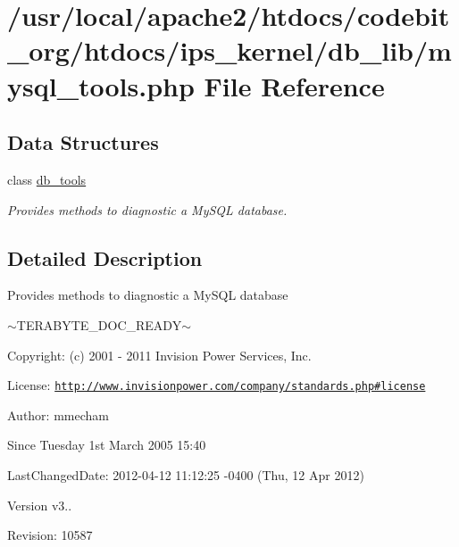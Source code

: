 \hypertarget{mysql__tools_8php}{\section{/usr/local/apache2/htdocs/codebit\-\_\-org/htdocs/ips\-\_\-kernel/db\-\_\-lib/mysql\-\_\-tools.php File Reference}
\label{mysql__tools_8php}
}
\subsection*{Data Structures}
\begin{DoxyCompactItemize}
\item 
class \hyperlink{classdb__tools}{db\-\_\-tools}
\begin{DoxyCompactList}\small\item\em Provides methods to diagnostic a My\-S\-Q\-L database. \end{DoxyCompactList}\end{DoxyCompactItemize}


\subsection{Detailed Description}
\begin{DoxyVerb}  Provides methods to diagnostic a MySQL database
\end{DoxyVerb}
 $\sim$\-T\-E\-R\-A\-B\-Y\-T\-E\-\_\-\-D\-O\-C\-\_\-\-R\-E\-A\-D\-Y$\sim$ \begin{DoxyParagraph}{Copyright\-:}
(c) 2001 -\/ 2011 Invision Power Services, Inc.
\end{DoxyParagraph}
\begin{DoxyParagraph}{License\-:}
\href{http://www.invisionpower.com/company/standards.php#license}{\tt http\-://www.\-invisionpower.\-com/company/standards.\-php\#license}
\end{DoxyParagraph}
\begin{DoxyParagraph}{Author\-:}
mmecham 
\end{DoxyParagraph}
\begin{DoxySince}{Since}
Tuesday 1st March 2005 15\-:40 
\end{DoxySince}
\begin{DoxyParagraph}{Last\-Changed\-Date\-:}
2012-\/04-\/12 11\-:12\-:25 -\/0400 (Thu, 12 Apr 2012) 
\end{DoxyParagraph}
\begin{DoxyVersion}{Version}
v3.. 
\end{DoxyVersion}
\begin{DoxyParagraph}{Revision\-:}
10587 
\end{DoxyParagraph}
